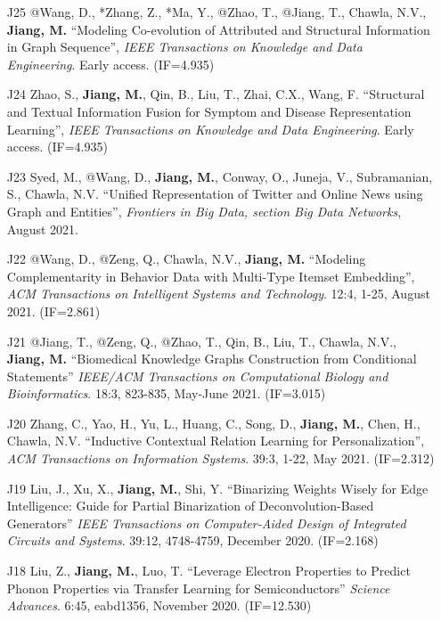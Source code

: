 \documentclass[10pt]{article}
\newenvironment{myindentpar}[1]%
{\begin{list}{}%
         {\setlength{\leftmargin}{#1}}%
         \item[]%
}
{\end{list}}
\newcounter{list}
\begin{document}
\begin{myindentpar}{0.00cm}
\begin{enumerate}[leftmargin=.5cm]
\item[J25] @Wang, D., *Zhang, Z., *Ma, Y., @Zhao, T., @Jiang, T., Chawla, N.V., \textbf{Jiang, M.} ``Modeling Co-evolution of Attributed and Structural Information in Graph Sequence'', \textit{IEEE Transactions on Knowledge and Data Engineering}. Early access. (IF=4.935)

\item[J24] Zhao, S., \textbf{Jiang, M.}, Qin, B., Liu, T., Zhai, C.X., Wang, F. ``Structural and Textual Information Fusion for Symptom and Disease Representation Learning'', \textit{IEEE Transactions on Knowledge and Data Engineering}. Early access. (IF=4.935)

\item[J23] Syed, M., @Wang, D., \textbf{Jiang, M.}, Conway, O., Juneja, V., Subramanian, S., Chawla, N.V. ``Unified Representation of Twitter and Online News using Graph and Entities'', \textit{Frontiers in Big Data, section Big Data Networks}, August 2021.
	
\item[J22] @Wang, D., @Zeng, Q., Chawla, N.V., \textbf{Jiang, M.} ``Modeling Complementarity in Behavior Data with Multi-Type Itemset Embedding'', \textit{ACM Transactions on Intelligent Systems and Technology}. 12:4, 1-25, August 2021. (IF=2.861)

\item[J21] @Jiang, T., @Zeng, Q., @Zhao, T., Qin, B., Liu, T., Chawla, N.V., \textbf{Jiang, M.} ``Biomedical Knowledge Graphs Construction from Conditional Statements'' \textit{IEEE/ACM Transactions on Computational Biology and Bioinformatics}. 18:3, 823-835, May-June 2021. (IF=3.015)

\item[J20] Zhang, C., Yao, H., Yu, L., Huang, C., Song, D., \textbf{Jiang, M.}, Chen, H., Chawla, N.V. ``Inductive Contextual Relation Learning for Personalization'', \textit{ACM Transactions on Information Systems}. 39:3, 1-22, May 2021. (IF=2.312)

\item[J19] Liu, J., Xu, X., \textbf{Jiang, M.}, Shi, Y. ``Binarizing Weights Wisely for Edge Intelligence: Guide for Partial Binarization of Deconvolution-Based Generators'' \textit{IEEE Transactions on Computer-Aided Design of Integrated Circuits and Systems}. 39:12, 4748-4759, December 2020. (IF=2.168)

\item[J18] Liu, Z., \textbf{Jiang, M.}, Luo, T. ``Leverage Electron Properties to Predict Phonon Properties via Transfer Learning for Semiconductors'' \textit{Science Advances}. 6:45, eabd1356, November 2020. (IF=12.530)
	

\end{enumerate}
\end{myindentpar}
\end{document}
